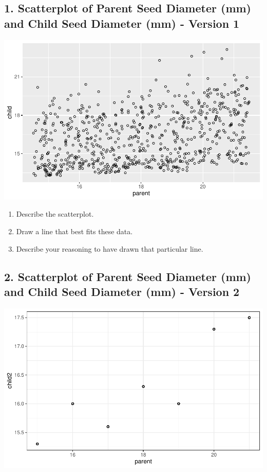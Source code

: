 \documentclass[]{article}
\begin{document}
\hypertarget{scatterplot-of-parent-seed-diameter-mm-and-child-seed-diameter-mm---version-1}{%
\subsection{1. Scatterplot of Parent Seed Diameter (mm) and Child Seed
Diameter (mm) - Version
1}\label{scatterplot-of-parent-seed-diameter-mm-and-child-seed-diameter-mm---version-1}}

\includegraphics{01_Lecture_Notes_files/figure-latex/peas-scatter-1.pdf}

\begin{enumerate}
\def\labelenumi{\arabic{enumi}.}
\item
  Describe the scatterplot. \vspace{2in}
\item
  Draw a line that best fits these data.
\item
  Describe your reasoning to have drawn that particular line.
  \vspace{1in}
\end{enumerate}

\newpage

\hypertarget{scatterplot-of-parent-seed-diameter-mm-and-child-seed-diameter-mm---version-2}{%
\subsection{2. Scatterplot of Parent Seed Diameter (mm) and Child Seed
Diameter (mm) - Version
2}\label{scatterplot-of-parent-seed-diameter-mm-and-child-seed-diameter-mm---version-2}}

\includegraphics{01_Lecture_Notes_files/figure-latex/peas-scatter-adj-1.pdf}
\end{document}
